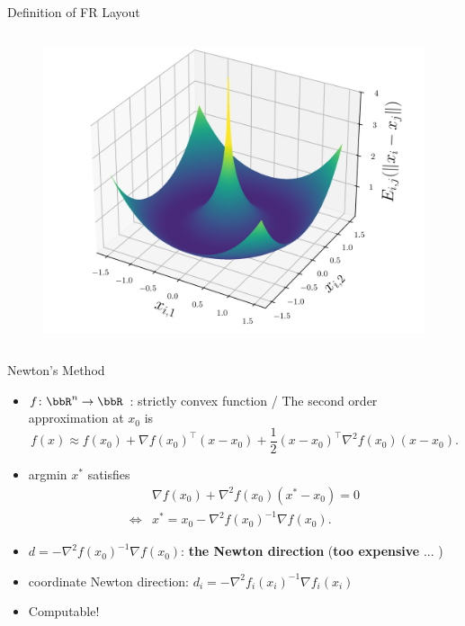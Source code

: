 \documentclass[dvipdfmx,13pt,aspectratio=169]{beamer}
\begin{document}
\begin{frame}{Definition of FR Layout}
\begin{columns}
\begin{column}{0.3\columnwidth}
\begin{figure}[h]
        \centering
        \includegraphics[width=\columnwidth]{../main/energy_3d/energy_3d.png}
      \end{figure}
    \end{column}
  \end{columns}
\end{frame}

\begin{frame}{Newton's Method}
  \begin{itemize}
    \item $f\colon \bbR^n \to \bbR$ : strictly convex function /  The second order approximation at $x_0$ is
          \begin{equation*}
            f(x) \approx f(x_0) + \nabla f(x_0)^\top (x - x_0) + \frac{1}{2} (x - x_0)^\top \nabla^2 f(x_0) (x - x_0).
          \end{equation*}
    \item  argmin $x^*$ satisfies
          \begin{align*}
                 & \nabla f(x_0) + \nabla^2 f(x_0) (x^* - x_0) = 0 \\
            \iff & x^* = x_0 - \nabla^2 f(x_0)^{-1} \nabla f(x_0).
          \end{align*}
    \item  $d = -\nabla^2 f(x_0)^{-1} \nabla f(x_0)$: \textbf{the Newton direction}
          (\textbf{too expensive} ... )
    \item coordinate Newton direction: $d_i = -\nabla^2 f_i(x_i)^{-1} \nabla f_i(x_i)$
    \item Computable!
  \end{itemize}
\end{frame}
\end{document}
